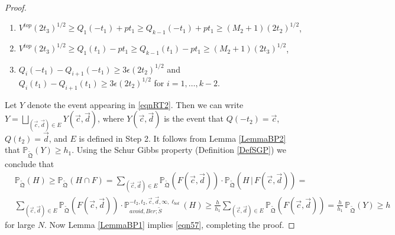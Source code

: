 \begin{proof}
	\begin{enumerate}
		\item $V^{top} (2t_3)^{1/2} \geq Q_1(-t_1) + p t_1 \geq Q_{k-1}(-t_1) + pt_1 \geq (M_2 + 1) (2t_2)^{1/2}$,
		\item $V^{top} (2t_3)^{1/2} \geq Q_1(t_1) - p t_1 \geq Q_{k-1}(t_1) - pt_1 \geq (M_2 + 1) (2t_3)^{1/2}$,
		\item $Q_i(-t_1) - Q_{i+1}(-t_1) \geq 3\epsilon (2t_2)^{1/2}$ and $Q_i(t_1) - Q_{i+1}(t_1)  \geq 3 \epsilon (2t_2)^{1/2}$ for $i = 1, \dots, k-2$.
	\end{enumerate}
	Let $Y$ denote the event appearing in \eqref{eqnRT2}. Then we can write $Y = \bigsqcup_{(\vec{c},\vec{d})\in E} Y(\vec{c},\vec{d})$, where $Y(\vec{c},\vec{d})$ is the event that $Q(-t_2) = \vec{c}$, $Q(t_2) = \vec{d}$, and $E$ is defined in Step 2. It follows from Lemma \ref{LemmaBP2} that $\mathbb{P}_{\tilde{\mathfrak Q}}(Y) \geq h_1$. Using the Schur Gibbs property (Definition \ref{DefSGP}) we conclude that
	\begin{align*}
	&\mathbb{P}_{\tilde{\mathfrak{Q}}}(H) \geq \mathbb{P}_{\tilde{\mathfrak{Q}}}(H\cap F) = \sum_{(\vec{c},\vec{d})\in E} \mathbb{P}_{\tilde{\mathfrak{Q}}}(F(\vec{c},\vec{d}))\cdot \mathbb{P}_{\tilde{\mathfrak{Q}}}(H\,|\,F(\vec{c},\vec{d})) =\\
	&\sum_{(\vec{c},\vec{d})\in E} \mathbb{P}_{\tilde{\mathfrak{Q}}}(F(\vec{c},\vec{d}))\cdot \mathbb{P}^{-t_2,t_2,\vec{c},\vec{d},\infty,\ell_{bot}}_{avoid,Ber;\tilde S}(H) \geq \frac{h}{h_1}\sum_{(\vec{c},\vec{d})\in E} \mathbb{P}_{\tilde{\mathfrak{Q}}}(F(\vec{c},\vec{d})) = \frac{h}{h_1}\,\mathbb{P}_{\tilde{\mathfrak{Q}}}(Y) \geq h
	\end{align*}
	for large $N$. Now Lemma \ref{LemmaBP1} implies \eqref{eqn57}, completing the proof.
\end{proof}